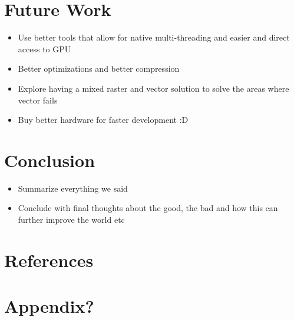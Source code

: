 \documentclass[12pt]{article}
\begin{document}
    \pagebreak


    \section{Future Work}

    \begin{itemize}
        \item Use better tools that allow for native multi-threading and easier and direct access to GPU
        \item Better optimizations and better compression
        \item Explore having a mixed raster and vector solution to solve the areas where vector fails
        \item Buy better hardware for faster development :D
    \end{itemize}

    \pagebreak


    \section{Conclusion}

    \begin{itemize}
        \item Summarize everything we said
        \item Conclude with final thoughts about the good, the bad and how this can further improve the world etc
    \end{itemize}

    \pagebreak


    \section{References}

    \pagebreak


    \section{Appendix?}

    \pagebreak
\end{document}
